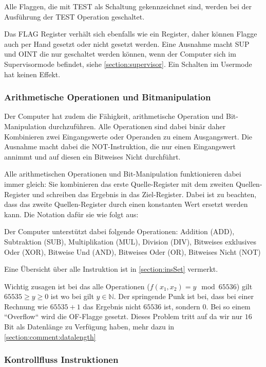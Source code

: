 \documentclass{scrartcl}
\begin{document}
Alle Flaggen, die mit TEST als Schaltung gekennzeichnet sind, werden bei der Ausführung der TEST Operation geschaltet.

Das FLAG Register verhält sich ebenfalls wie ein Register, daher können Flagge auch per Hand gesetzt oder nicht gesetzt werden. Eine Ausnahme macht SUP und OINT die nur geschaltet werden können, wenn der Computer sich im Supervisormode befindet, siehe \autoref{section:supervisor}. Ein Schalten im Usermode hat keinen Effekt.


\subsubsection{\label{section:arthimatik}Arithmetische Operationen und Bitmanipulation}

Der Computer hat zudem die Fähigkeit, arithmetische Operation und Bit-Manipulation durchzuführen. Alle Operationen sind dabei binär daher Kombinieren zwei Eingangswerte oder Operanden zu einem Ausgangswert. Die Ausnahme macht dabei die NOT-Instruktion, die nur einen Eingangswert annimmt und auf diesen ein Bitweises Nicht durchführt. 

Alle arithmetischen Operationen und Bit-Manipulation funktionieren dabei immer gleich: Sie kombinieren das erste Quelle-Register mit dem zweiten Quellen-Register und schreiben das Ergebnis in das Ziel-Register. Dabei ist zu beachten, dass das zweite Quellen-Register durch einen konstanten Wert ersetzt werden kann. Die Notation dafür sie wie folgt aus:


Der Computer unterstützt dabei folgende Operationen: Addition (ADD), Subtraktion (SUB), Multiplikation (MUL), Division (DIV), Bitweises exklusives Oder (XOR), Bitweise Und (AND), Bitweises Oder (OR), Bitweises Nicht (NOT)

Eine Übersicht über alle Instruktion ist in \autoref{section:insSet} vermerkt.

Wichtig zusagen ist bei das alle Operationen ($f(x_1, x_2) = y \mod 65536$) gilt $65535 \ge y \ge 0$ ist wo bei gilt $y \in \mathbb{N}$. Der springende Punk ist bei, dass bei einer Rechnung wie $65535 + 1$ das Ergebnis nicht $65536$ ist, sondern $0$. Bei so einem “Overflow“ wird die OF-Flagge gesetzt. Dieses Problem tritt auf da wir nur $16$ Bit als Datenlänge zu Verfügung haben, mehr dazu in \autoref{section:comment:datalength}

\subsubsection{\label{section:controllflow}Kontrollfluss Instruktionen}
\end{document}
